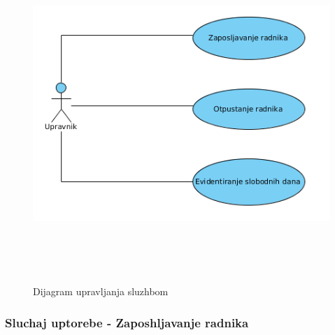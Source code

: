 \documentclass[10 pt]{article}
\begin{document}
	\begin{figure}[H]
		\centering
		\includegraphics[width=12cm,height=12cm,keepaspectratio]{slike/UCUpravljanjeSluzbom.png}\\
		\caption{Dijagram upravljanja sluzhbom}
	\end{figure}
	\newpage
	\subsubsection{Sluchaj uptorebe - Zaposhljavanje radnika}
		
\end{document}
